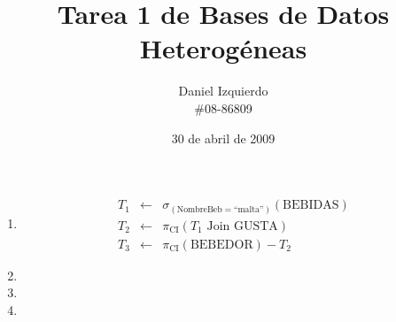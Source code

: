 \documentclass[12pt]{article}
\newcommand{\asig}{\ensuremath{\leftarrow}}
\begin{document}

\title{Tarea 1 de Bases de Datos Heterogéneas}
\author{Daniel Izquierdo \\ \#08-86809}
\date{30 de abril de 2009}

\maketitle

\begin{enumerate}

 \item 

\begin{eqnarray*}
 T_1 & \asig & \sigma_{(\text{NombreBeb}=\text{``malta''})}(\text{BEBIDAS}) \\
 T_2 & \asig & \pi_{\text{CI}}(T_1 \text{ Join } \text{GUSTA}) \\
 T_3 & \asig & \pi_{\text{CI}}(\text{BEBEDOR}) - T_2
\end{eqnarray*}

 \item 

 \item 

 \item 

\end{enumerate}
\end{document}
